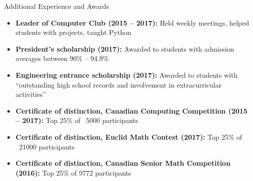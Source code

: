\documentclass[calibri]{mcdowellcv}
\begin{document}
    \begin{cvsection}{\Large{Additional Experience and Awards}}
        \begin{cvsubsection}{}{}{}
            \begin{itemize}
                \item \textbf{Leader of Computer Club (2015 -- 2017):} Held weekly meetings, helped students with projects, taught Python
                \item \textbf{President's scholarship (2017):} Awarded to students with admission averages between 90\% -- 94.9\%
                \item \textbf{Engineering entrance scholarship (2017):} Awarded to students with ``outstanding high school records and involvement in extracurricular activities''
                \item \textbf{Certificate of distinction, Canadian Computing Competition (2015 -- 2017):} Top 25\% of ~5000 participants
                \item \textbf{Certificate of distinction, Euclid Math Contest (2017):} Top 25\% of ~21000 participants
                \item \textbf{Certificate of distinction, Canadian Senior Math Competition (2016):} Top 25\% of 9772 participants
            \end{itemize}
        \end{cvsubsection}
    \end{cvsection}
\end{document}
